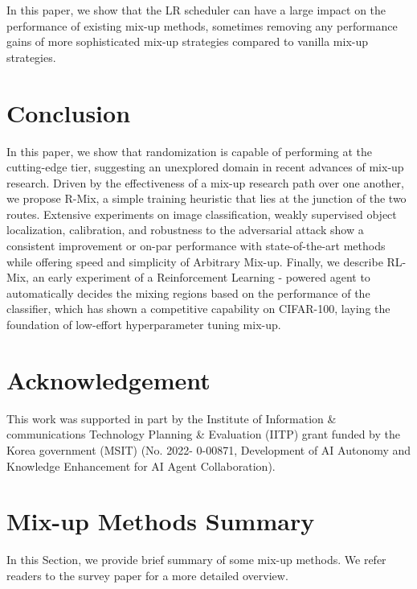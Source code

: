 \documentclass[letterpaper]{article} \usepackage[submission]{aaai23}  \usepackage{times}  \usepackage{helvet}  \usepackage{courier}  \usepackage[hyphens]{url}  \usepackage{graphicx} \urlstyle{rm} \def\UrlFont{\rm}  \usepackage{natbib}  \usepackage{caption} \frenchspacing  \setlength{\pdfpagewidth}{8.5in} \setlength{\pdfpageheight}{11in}
\newcommand{\rrlmix}{{R-Mix}}
\newcommand{\cifar}{CIFAR-100}
\begin{document}
In this paper, we show that the LR scheduler can have a large impact on the performance of existing mix-up methods, sometimes removing any performance gains of more sophisticated mix-up strategies compared to vanilla mix-up strategies. 
\section{Conclusion}
\label{sec:concl}
In this paper, we show that randomization is capable of performing at the cutting-edge tier, suggesting an unexplored domain in recent advances of mix-up research. Driven by the effectiveness of a mix-up research path over one another, we propose \rrlmix{}, a simple training heuristic that lies at the junction of the two routes. Extensive experiments on image classification, weakly supervised object localization, calibration, and robustness to the adversarial attack show a consistent improvement or on-par performance with state-of-the-art methods while offering speed and simplicity of Arbitrary Mix-up.
Finally, we describe RL-Mix, an early experiment of a Reinforcement Learning - powered agent to automatically decides the mixing regions based on the performance of the classifier, which has shown a competitive capability on \cifar{}, laying the foundation of low-effort hyperparameter tuning mix-up.

\section*{Acknowledgement}
This work was supported in part by the Institute of Information \& communications Technology Planning \& Evaluation (IITP) grant funded by the Korea government (MSIT) (No. 2022- 0-00871, Development of AI Autonomy and Knowledge Enhancement for AI Agent Collaboration).



\clearpage


\section*{Mix-up Methods Summary}
In this Section, we provide brief summary of some mix-up methods. We refer readers to the survey paper \cite{naveed2021survey} for a more detailed overview.
\end{document}

